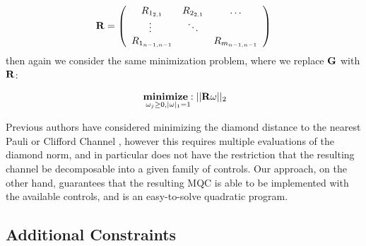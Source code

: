 \documentclass[aps,nofootinbib,pra,notitlepage,twocolumn]{revtex4-1}
\begin{document}
\begin{equation}\label{eq:vectorized_off_diagonal}
	\bold{R} = \left(\begin{array}{cccc}
		R_{1_{2,1}} & R_{2_{2,1}} & \ldots   \\ 
		\vdots\ & \ddots &    \\
		R_{1_{n-1,n-1}} &  &  R_{m_{n-1,n-1}} \\ 
	\end{array} 	
	\right)
\end{equation}
then again we consider the same minimization problem, where we replace $\bold{G}$ with $\bold{R}$:

\begin{equation}\label{eq:minimization_diagonal}
  \begin{split}
    &\underset{\omega_j\geq0, |\omega|_1=1}{\textbf{minimize}: } ||\bold{R}\omega||_2\\
  \end{split}
\end{equation}

Previous authors have considered minimizing the diamond distance to the nearest Pauli or Clifford Channel \cite{Magesan2013}, however this requires multiple evaluations of the diamond norm, and in particular does not have the restriction that the resulting channel be decomposable into a given family of controls. Our approach, on the other hand, guarantees that the resulting MQC is able to be implemented with the available controls, and is an easy-to-solve quadratic program.

\subsection{Additional Constraints}
\end{document}
